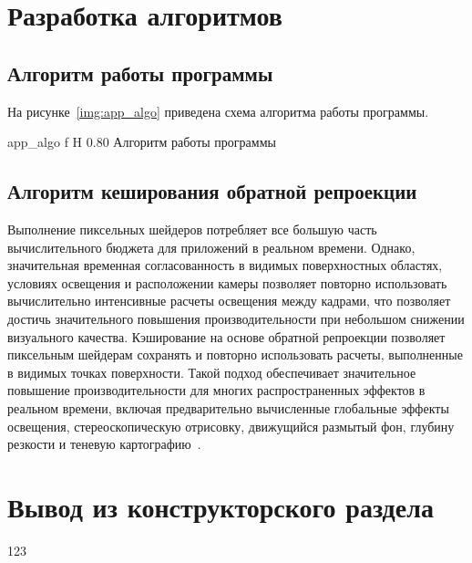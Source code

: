 \section{Разработка алгоритмов}

\subsection{Алгоритм работы программы}

На рисунке~\ref{img:app_algo} приведена схема алгоритма работы программы.

    {app_algo}
    {f}
    {H}
    {0.80\textwidth}
    {Алгоритм работы программы}

\subsection{Алгоритм кеширования обратной репроекции}
Выполнение пиксельных шейдеров потребляет все большую часть вычислительного бюджета для приложений в 
реальном времени. Однако, значительная временная согласованность в видимых поверхностных областях, 
условиях освещения и расположении камеры позволяет повторно использовать вычислительно интенсивные 
расчеты освещения между кадрами, что позволяет достичь значительного повышения производительности 
при небольшом снижении визуального качества. 
Кэширование на основе обратной репроекции позволяет пиксельным шейдерам сохранять и повторно использовать 
расчеты, выполненные в видимых точках поверхности. 
Такой подход обеспечивает значительное повышение производительности для многих распространенных 
эффектов в реальном времени, включая предварительно вычисленные глобальные эффекты освещения, 
стереоскопическую отрисовку, движущийся размытый фон, глубину резкости и теневую картографию~\cite{ARTSwRPC}.

\section{Вывод из конструкторского раздела}

123
